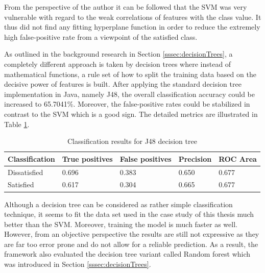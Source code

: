 From the perspective of the author it can be followed that the SVM was very vulnerable with regard to the weak correlations of features with the class value. It thus did not find any fitting hyperplane function in order to reduce the extremely high false-positive rate from a viewpoint of the satisfied class. 

As outlined in the background research in Section \ref{sssec:decisionTrees}, a completely different approach is taken by decision trees where instead of mathematical functions, a rule set of how to split the training data based on the decisive power of features is built. After applying the standard decision tree implementation in Java, namely J48, the overall classification accuracy could be increased to 65.7041\%. Moreover, the false-positive rates could be stabilized in contrast to the SVM which is a good sign. The detailed metrics are illustrated in Table \ref{tab:decisionTreeResult}. 

\begin{table}[]
	\centering
	\begin{tabular}{|l|l|l|l|l|}
		\hline
		\textbf{Classification} & \textbf{True positives} & \textbf{False positives} & \textbf{Precision} & \textbf{ROC Area} \\ \hline
		Dissatisfied            & 0.696                 & 0.383                    & 0.650              & 0.677             \\ \hline
		Satisfied               & 0.617                   & 0.304                    & 0.665                & 0.677             \\ \hline
	\end{tabular}
	\caption{Classification results for J48 decision tree}
	\label{tab:decisionTreeResult}
\end{table}

Although a decision tree can be considered as rather simple classification technique, it seems to fit the data set used in the case study of this thesis much better than the SVM. Moreover, training the model is much faster as well. However, from an objective perspective the results are still not expressive as they are far too error prone and do not allow for a reliable prediction. As a result, the framework also evaluated the decision tree variant called Random forest which was introduced in Section \ref{sssec:decisionTrees}. 

